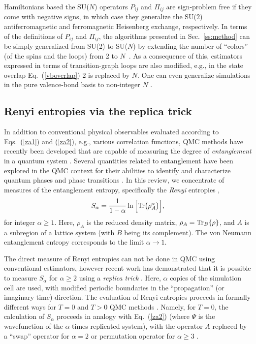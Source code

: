 \documentclass[range]{ar2e}
\begin{document}
Hamiltonians based the SU($N$) operators $P_{ij}$ and $\Pi_{ij}$ are sign-problem free if they come with negative signs, in which case
they generalize the SU($2$) antiferromagnetic and ferromagnetic Heisenberg exchange, respectively. In terms of the definitions of $P_{ij}$ and 
$\Pi_{ij}$, the algorithms presented in Sec.~\ref{ss:method} can be simply generalized from SU(2) to SU($N$) by extending the number of ``colors'' 
(of the spins and the loops) from 2 to $N$~\cite{harada2003:sun,beach2009:sun,kaul2011:j1j2}. As a consequence of this, estimators expressed in terms
of transition-graph loops are also modified, e.g., in the state overlap Eq.~(\ref{vboverlap}) $2$ is replaced by $N$. One can even generalize
simulations in the pure valence-bond basis to non-integer $N$ \cite{beach2009:sun}.

\subsection{Renyi entropies via the replica trick} 
\label{ss:renyi}

In addition to conventional physical observables evaluated according to Eqs.~(\ref{za1}) and (\ref{za2}), e.g., various correlation functions, 
QMC methods have recently been developed that are capable of measuring the degree of {\it entanglement} in a quantum system \cite{EntangleMeasure}. Several 
quantities related to entanglement have been explored in the QMC context for their abilities to identify and characterize quantum phases and phase 
transitions \cite{Tommaso1,Tommaso2,fluc1,fluc2,fid1,fid2}.  In this review, we concentrate of measures of the entanglement entropy, specifically 
the {\it Renyi} entropies \cite{renyi},
\begin{equation}
S_{\alpha} = \frac{1}{1-\alpha} \ln \Big[ {\rm Tr}\big( \rho_A^{\alpha} \big) \Big],
\end{equation}
for integer $\alpha \ge 1$.  Here, $\rho_A$ is the reduced density matrix, $\rho_A = {\rm Tr}_B \{\rho\}$, and $A$ is a subregion of 
a lattice system (with $B$ being its complement). The von Neumann entanglement entropy corresponds to the limit $\alpha \to 1$.
 
The direct measure of Renyi entropies can not be done in QMC using conventional estimators, however recent work has demonstrated that it is possible to measure 
$S_{\alpha}$ for $\alpha \ge 2$ using a {\it replica trick} \cite{Holz,Cardy, Fradkin, BP, Naka}.  Here, $\alpha$ copies of the simulation cell are used, with modified 
periodic boundaries in the ``propagation'' (or imaginary time) direction.  The evaluation of Renyi entropies proceeds in formally different ways for $T=0$ and $T>0$ 
QMC methods \cite{Hastings10,Melko10}.  Namely, for $T=0$, the calculation of $S_{\alpha}$ proceeds in analogy with Eq.~(\ref{za2}) (where $\Psi$ is the wavefunction 
of the $\alpha$-times replicated system), with the operator $A$ replaced by a ``swap'' operator for $\alpha=2$ \cite{Hastings10} or permutation operator for 
$\alpha \ge 3$ \cite{Kallin11}. 
\end{document}
